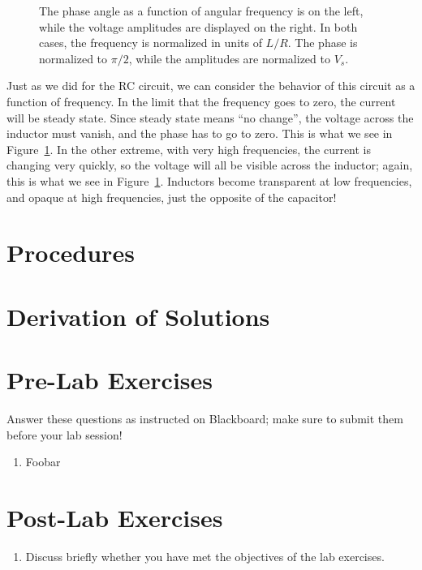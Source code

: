 \documentclass[12pt]{article}
\begin{document}
\begin{figure}
  \centering
  \caption{The phase angle as a function of angular frequency is on
    the left, while the voltage amplitudes are displayed on the
    right.  In both cases, the frequency is normalized in units of
    $L/R$.  The phase is normalized to $\pi/2$, while the amplitudes
    are normalized to $V_s$.}
  \label{fig:frequency}
\end{figure}
Just as we did for the RC circuit, we can consider the behavior of
this circuit as a function of frequency.  In the limit that the
frequency goes to zero, the current will be steady state.  Since
steady state means ``no change'', the voltage across the inductor must
vanish, and the phase has to go to zero.  This is what we see in
Figure~\ref{fig:frequency}.  In the other extreme, with very high
frequencies, the current is changing very quickly, so the voltage will
all be visible across the inductor; again, this is what we see in
Figure~\ref{fig:frequency}.  Inductors become transparent at low
frequencies, and opaque at high frequencies, just the opposite of the
capacitor!

\section{Procedures}
\label{sec:procedures}


\appendix

\section{Derivation of Solutions}
\label{sec:solutions}


\newpage

\section*{Pre-Lab Exercises}

Answer these questions as instructed on Blackboard; make sure to
submit them before your lab session!

\begin{enumerate}
\item Foobar
\end{enumerate}

\newpage

\section*{Post-Lab Exercises}

\begin{enumerate}
\item Discuss briefly whether you have met the objectives of the lab
  exercises.
\end{enumerate}
\end{document}
